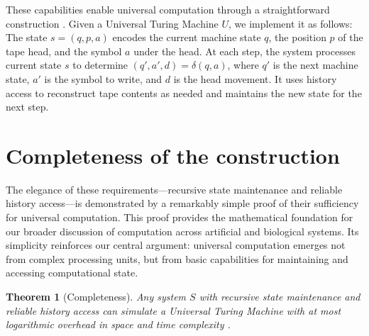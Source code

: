 \documentclass[12pt]{article}
\newtheorem{theorem}{Theorem}
\begin{document}
These capabilities enable universal computation through a straightforward construction \cite{deutsch1995universality,bennett1989time}.
Given a Universal Turing Machine $U$, we implement it as follows: The state $s = (q, p, a)$ encodes the current machine state $q$, the position $p$ of the tape head, and the symbol $a$ under the head.
At each step, the system processes current state $s$ to determine $(q', a', d) = \delta(q, a)$, where $q'$ is the next machine state, $a'$ is the symbol to write, and $d$ is the head movement.
It uses history access to reconstruct tape contents as needed and maintains the new state for the next step.

\section{Completeness of the construction}

The elegance of these requirements---recursive state maintenance and reliable history access---is demonstrated by a remarkably simple proof of their sufficiency for universal computation.
This proof provides the mathematical foundation for our broader discussion of computation across artificial and biological systems.
Its simplicity reinforces our central argument: universal computation emerges not from complex processing units, but from basic capabilities for maintaining and accessing computational state.

\vspace{1em}

\begin{theorem}[Completeness]
Any system $S$ with recursive state maintenance and reliable history access can simulate a Universal Turing Machine with at most logarithmic overhead in space and time complexity \cite{boyle2024memory,liskiewicz1994complexity}.
\end{theorem}
\end{document}
